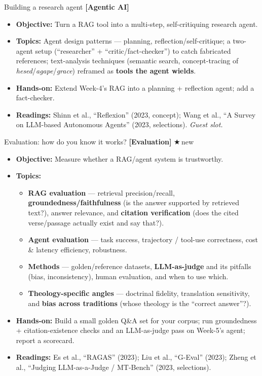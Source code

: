 \documentclass[11pt]{article}
\newcommand{\pillar}[1]{{\small\color{accent}\textbf{[#1]}}}
\newcommand{\newtag}{{\small\color{accent}$\bigstar$\,new}}
\newenvironment{week}[2]{%
  \vspace{0.4em}
  \noindent{\color{primary}\bfseries #1}\; #2\par\nobreak
  \begin{itemize}[leftmargin=1.4em,itemsep=1pt,topsep=2pt]}%
  {\end{itemize}}
\begin{document}
\begin{week}{Week 5}{Building a research agent \pillar{Agentic AI}}
  \item \textbf{Objective:} Turn a RAG tool into a multi-step, self-critiquing research agent.
  \item \textbf{Topics:} Agent design patterns --- planning, reflection/self-critique; a two-agent setup
    (``researcher'' + ``critic/fact-checker'') to catch fabricated references; text-analysis techniques
    (semantic search, concept-tracing of \emph{hesed}/\emph{agape}/\emph{grace}) reframed as \textbf{tools the agent wields}.
  \item \textbf{Hands-on:} Extend Week-4's RAG into a planning + reflection agent; add a fact-checker.
  \item \textbf{Readings:} Shinn et al., ``Reflexion'' (2023, concept); Wang et al., ``A Survey on LLM-based
    Autonomous Agents'' (2023, selections). \emph{Guest slot.}
\end{week}

\begin{week}{Week 6}{Evaluation: how do you know it works? \pillar{Evaluation} \newtag}
  \item \textbf{Objective:} Measure whether a RAG/agent system is trustworthy.
  \item \textbf{Topics:}
    \begin{itemize}[leftmargin=1.2em,itemsep=1pt,topsep=1pt]
      \item \textbf{RAG evaluation} --- retrieval precision/recall, \textbf{groundedness/faithfulness} (is the answer
        supported by retrieved text?), answer relevance, and \textbf{citation verification} (does the cited
        verse/passage actually exist and say that?).
      \item \textbf{Agent evaluation} --- task success, trajectory / tool-use correctness, cost \& latency
        efficiency, robustness.
      \item \textbf{Methods} --- golden/reference datasets, \textbf{LLM-as-judge} and its pitfalls (bias, inconsistency),
        human evaluation, and when to use which.
      \item \textbf{Theology-specific angles} --- doctrinal fidelity, translation sensitivity, and \textbf{bias across
        traditions} (whose theology is the ``correct answer''?).
    \end{itemize}
  \item \textbf{Hands-on:} Build a small golden Q\&A set for your corpus; run groundedness + citation-existence
    checks and an LLM-as-judge pass on Week-5's agent; report a scorecard.
  \item \textbf{Readings:} Es et al., ``RAGAS'' (2023); Liu et al., ``G-Eval'' (2023); Zheng et al., ``Judging
    LLM-as-a-Judge / MT-Bench'' (2023, selections).
\end{week}
\end{document}
